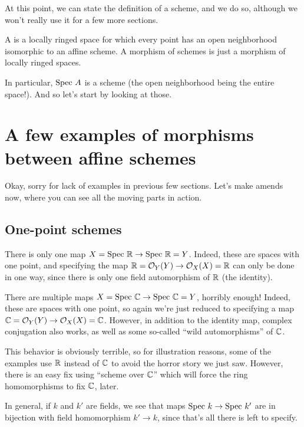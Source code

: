 At this point, we can state the definition of a scheme,
and we do so, although we won't really use it for a few more sections.
\begin{definition}
	A  is a locally ringed space
	for which every point has an open neighborhood
	isomorphic to an affine scheme.
	A morphism of schemes is just a morphism of locally ringed spaces.
\end{definition}
In particular, $\text{Spec } A$ is a scheme
(the open neighborhood being the entire space!).
And so let's start by looking at those.

\section{A few examples of morphisms between affine schemes}
Okay, sorry for lack of examples in previous few sections.
Let's make amends now,
where you can see all the moving parts in action.

\subsection{One-point schemes}
\begin{example}
	There is only one map $X = \text{Spec } \mathbb R \to \text{Spec } \mathbb R = Y$.
	Indeed, these are spaces with one point,
	and specifying the map $\mathbb R = \mathcal O_Y(Y) \to \mathcal O_X(X) = \mathbb R$
	can only be done in one way,
	since there is only one field automorphism of $\mathbb R$ (the identity).
\end{example}
\begin{example}
	There are multiple maps $X = \text{Spec } \mathbb C \to \text{Spec } \mathbb C = Y$,
	horribly enough!
	Indeed, these are spaces with one point,
	so again we're just reduced to specifying
	a map $\mathbb C = \mathcal O_Y(Y) \to \mathcal O_X(X) = \mathbb C$.
	However, in addition to the identity map,
	complex conjugation also works,
	as well as some so-called ``wild automorphisms'' of $\mathbb C$.
\end{example}

This behavior is obviously terrible,
so for illustration reasons,
some of the examples use $\mathbb R$ instead of $\mathbb C$
to avoid the horror story we just saw.
However, there is an easy fix using ``scheme over $\mathbb C$''
which will force the ring homomorphisms to fix $\mathbb C$, later.

\begin{example}
	In general, if $k$ and $k'$ are fields,
	we see that maps $\text{Spec } k \to \text{Spec } k'$
	are in bijection with field homomorphism $k' \to k$,
	since that's all there is left to specify.
\end{example}

